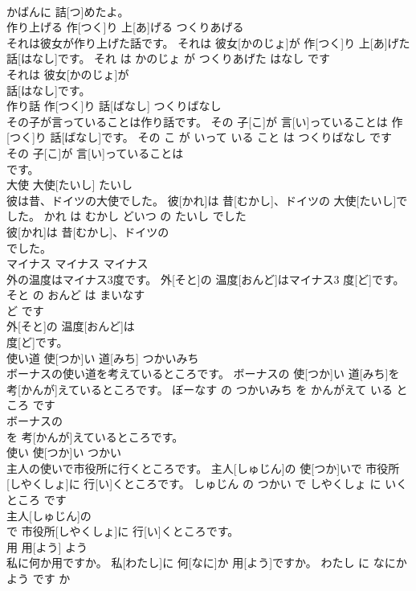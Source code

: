 \documentclass[8pt]{extreport}
\begin{document}
\begin{CJK}{UTF8}{min}
\\	かばんに 詰[つ]めたよ。			
\\	作り上げる	作[つく]り 上[あ]げる	つくりあげる	
\\	それは彼女が作り上げた話です。	それは 彼女[かのじょ]が 作[つく]り 上[あ]げた 話[はなし]です。	それ は かのじょ が つくりあげた はなし です	
\\	それは 彼女[かのじょ]が
\\	話[はなし]です。			
\\	作り話	作[つく]り 話[ばなし]	つくりばなし	
\\	その子が言っていることは作り話です。	その 子[こ]が 言[い]っていることは 作[つく]り 話[ばなし]です。	その こ が いって いる こと は つくりばなし です	
\\	その 子[こ]が 言[い]っていることは
\\	です。			
\\	大使	大使[たいし]	たいし	
\\	彼は昔、ドイツの大使でした。	彼[かれ]は 昔[むかし]、ドイツの 大使[たいし]でした。	かれ は むかし どいつ の たいし でした	
\\	彼[かれ]は 昔[むかし]、ドイツの
\\	でした。			
\\	マイナス	マイナス	マイナス	
\\	外の温度はマイナス3度です。	外[そと]の 温度[おんど]はマイナス3 度[ど]です。	そと の おんど は まいなす 
\\	ど です	
\\	外[そと]の 温度[おんど]は
\\	度[ど]です。			
\\	使い道	使[つか]い 道[みち]	つかいみち	
\\	ボーナスの使い道を考えているところです。	ボーナスの 使[つか]い 道[みち]を 考[かんが]えているところです。	ぼーなす の つかいみち を かんがえて いる ところ です	
\\	ボーナスの
\\	を 考[かんが]えているところです。			
\\	使い	使[つか]い	つかい	
\\	主人の使いで市役所に行くところです。	主人[しゅじん]の 使[つか]いで 市役所[しやくしょ]に 行[い]くところです。	しゅじん の つかい で しやくしょ に いく ところ です	
\\	主人[しゅじん]の
\\	で 市役所[しやくしょ]に 行[い]くところです。			
\\	用	用[よう]	よう	
\\	私に何か用ですか。	私[わたし]に 何[なに]か 用[よう]ですか。	わたし に なにか よう です か	

\end{CJK}
\end{document}
